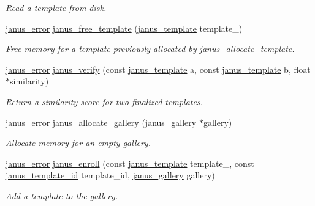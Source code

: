 \begin{DoxyCompactItemize}
\begin{DoxyCompactList}\small\item\em Read a template from disk. \end{DoxyCompactList}\item 
\hyperlink{group__janus_ga1b275e4dade484951b366f785597b8f6}{janus\+\_\+error} \hyperlink{group__janus_gaa4a9154ad52b30392a4ed01a5b30a4c5}{janus\+\_\+free\+\_\+template} (\hyperlink{group__janus_gaabac6b357615bbd03a082c714190e2d0}{janus\+\_\+template} template\+\_\+)
\begin{DoxyCompactList}\small\item\em Free memory for a template previously allocated by \hyperlink{group__janus_ga8619857e68a2dacee603313b042f2fcc}{janus\+\_\+allocate\+\_\+template}. \end{DoxyCompactList}\item 
\hyperlink{group__janus_ga1b275e4dade484951b366f785597b8f6}{janus\+\_\+error} \hyperlink{group__janus_gac59b09b7014e19ad2c270f44da9f8e83}{janus\+\_\+verify} (const \hyperlink{group__janus_gaabac6b357615bbd03a082c714190e2d0}{janus\+\_\+template} a, const \hyperlink{group__janus_gaabac6b357615bbd03a082c714190e2d0}{janus\+\_\+template} b, float $\ast$similarity)
\begin{DoxyCompactList}\small\item\em Return a similarity score for two finalized templates. \end{DoxyCompactList}\item 
\hyperlink{group__janus_ga1b275e4dade484951b366f785597b8f6}{janus\+\_\+error} \hyperlink{group__janus_ga38b61036a5fb27671ee104c61f35a0b7}{janus\+\_\+allocate\+\_\+gallery} (\hyperlink{group__janus_ga64368fd83d5e9abfd9ef6ab6231866e8}{janus\+\_\+gallery} $\ast$gallery)
\begin{DoxyCompactList}\small\item\em Allocate memory for an empty gallery. \end{DoxyCompactList}\item 
\hyperlink{group__janus_ga1b275e4dade484951b366f785597b8f6}{janus\+\_\+error} \hyperlink{group__janus_ga15142aae31a6ce2365776e7ff1ef4dfb}{janus\+\_\+enroll} (const \hyperlink{group__janus_gaabac6b357615bbd03a082c714190e2d0}{janus\+\_\+template} template\+\_\+, const \hyperlink{group__janus_ga666a973aaa28bebd89ea5da37853bb87}{janus\+\_\+template\+\_\+id} template\+\_\+id, \hyperlink{group__janus_ga64368fd83d5e9abfd9ef6ab6231866e8}{janus\+\_\+gallery} gallery)
\begin{DoxyCompactList}\small\item\em Add a template to the gallery. \end{DoxyCompactList}\item 

\end{DoxyCompactItemize}
